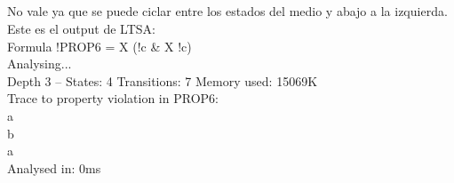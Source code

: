 \subsection{}
No vale ya que se puede ciclar entre los estados del medio y abajo a la izquierda. Este es el output de LTSA: \\

Formula !PROP6 = X (!c & X !c) \\
Analysing... \\
Depth 3 -- States: 4 Transitions: 7 Memory used: 15069K \\
Trace to property violation in PROP6: \\
  a \\
  b \\
  a \\
Analysed in: 0ms \\

